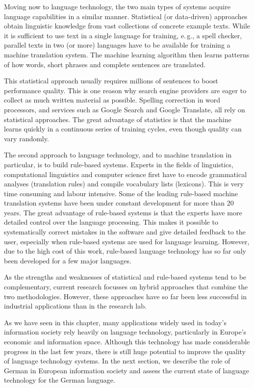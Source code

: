 \documentclass[]{../../metanetpaper}
\begin{document}
\begin{multicols}{2}
Moving now to language technology, the two main types of systems acquire language capabilities in a similar manner. Statistical (or data-driven) approaches obtain linguistic knowledge from vast collections of concrete example texts. While it is sufficient to use text in a single language for training, e.\,g., a spell checker, parallel texts in two (or more) languages have to be available for training a machine translation system. The machine learning algorithm then learns patterns of how words, short phrases and complete sentences are translated. 

This statistical approach usually requires millions of sentences to boost performance quality. This is one reason why search engine providers are eager to collect as much written material as possible. Spelling correction in word processors, and services such as Google Search and Google Translate, all rely on statistical approaches. The great advantage of statistics is that the machine learns quickly in a continuous series of training cycles, even though quality can vary randomly.

The second approach to language technology, and to machine translation in particular, is to build rule-based systems. Experts in the fields of linguistics, computational linguistics and computer science first have to encode grammatical analyses (translation rules) and compile vocabulary lists (lexicons). This is very time consuming and labour intensive. Some of the leading rule-based machine translation systems have been under constant development for more than 20 years. The great advantage of rule-based systems is that the experts have more detailed control over the language processing. This makes it possible to systematically correct mistakes in the software and give detailed feedback to the user, especially when rule-based systems are used for language learning. However, due to the high cost of this work, rule-based language technology has so far only been developed for a few major languages. 


As the strengths and weaknesses of statistical and rule-based systems tend to be complementary, current research focusses on hybrid approaches that combine the two methodologies. However, these approaches have so far been less successful in industrial applications than in the research lab. 

As we have seen in this chapter, many applications widely used in today’s information society rely heavily on language technology, particularly in Europe’s economic and information space. Although this technology has made considerable progress in the last few years, there is still huge potential to improve the quality of language technology systems. In the next section, we describe the role of German in European information society and assess the current state of language technology for the German language.
\end{multicols}
\end{document}
